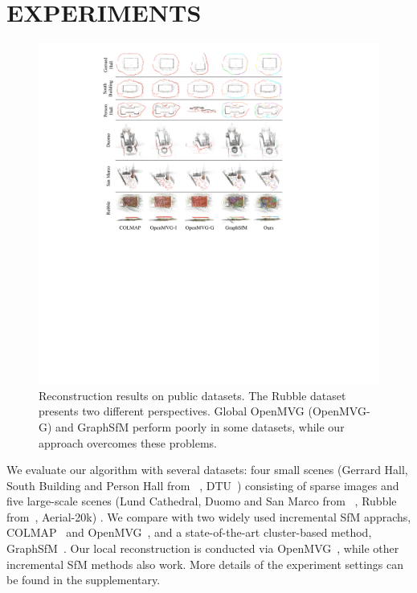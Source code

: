 \documentclass[runningheads]{llncs}
\begin{document}
\section{EXPERIMENTS}
\begin{figure}[t]
    \centering
        \includegraphics[width=1\textwidth]{figs/compare_all.pdf}
        \caption{Reconstruction results on public datasets. The Rubble dataset presents two different perspectives. Global OpenMVG (OpenMVG-G) and GraphSfM perform poorly in some datasets, while our approach overcomes these problems. }
    \label{fig_compare_all}
    \vspace{-1.5em}
\end{figure}
We evaluate our algorithm with several datasets: four small scenes (Gerrard Hall, South Building and Person Hall from ~\cite{colmap}, DTU~\cite{DTU}) consisting of sparse images and five large-scale scenes (Lund Cathedral, Duomo and San Marco from ~\cite{Duomo}, Rubble from~\cite{Rubble}, Aerial-20k) . We compare with two widely used incremental SfM apprachs, COLMAP~\cite{colmap} and OpenMVG~\cite{mvg}, and a state-of-the-art cluster-based method, GraphSfM~\cite{gsfm}. Our local reconstruction is conducted via OpenMVG~\cite{mvg}, while other incremental SfM methods also work. More details of the experiment settings can be found in the supplementary.
\end{document}
